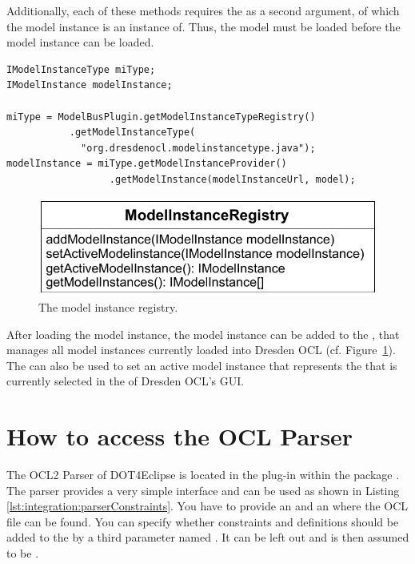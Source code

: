 Additionally, each of these methods requires the  as a second
argument, of which the model instance is an instance of. Thus, the model must be
loaded before the model instance can be loaded.

\lstset{
  language=Java
}
\begin{lstlisting}[caption={How to load a model instance.}, captionpos=b, label=lst:integration:loadModelInstance, float]
IModelInstanceType miType;
IModelInstance modelInstance;

miType = ModelBusPlugin.getModelInstanceTypeRegistry()
           .getModelInstanceType(
             "org.dresdenocl.modelinstancetype.java");
modelInstance = miType.getModelInstanceProvider()
                  .getModelInstance(modelInstanceUrl, model);
\end{lstlisting}

\begin{figure}[!b]
	\centering
	\includegraphics[width=.75\linewidth]{figures/integration/modelInstanceRegistry}
	\caption{The model instance registry.}
	\label{pic:integration:modelInstanceRegistry}
\end{figure}

After loading the model instance, the model instance can be added to the
, that manages all model instances currently
loaded into Dresden OCL (cf.
Figure~\ref{pic:integration:modelInstanceRegistry}).
The  can also be used to set an active model
instance that represents the  that is currently selected in
the  of Dresden OCL's GUI.



\section{How to access the OCL Parser}
The \acs{OCL}2 Parser of \acl{DOT4Eclipse} is located in the plug-in 
 within
the package
.
The parser provides a very simple interface and can be used as shown in Listing
\ref{lst:integration:parserConstraints}. You have to provide an 
and an  where the \acs{OCL} file can be found. You can specify whether
constraints and definitions should be added to the  by a third
parameter named . It can be left out and is then assumed to be
.

